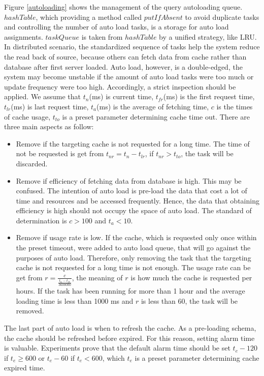 \documentclass{singlecol-new}
\theoremstyle{TH}{
\newtheorem{lemma}{Lemma}
\newtheorem{theorem}[lemma]{Theorem}
\newtheorem{corrolary}[lemma]{Corrolary}
\newtheorem{conjecture}[lemma]{Conjecture}
\newtheorem{proposition}[lemma]{Proposition}
\newtheorem{claim}[lemma]{Claim}
\newtheorem{stheorem}[lemma]{Wrong Theorem}
}
\theoremstyle{THrm}{
\newtheorem{definition}{Definition}[section]
\newtheorem{question}{Question}[section]
\newtheorem{remark}{Remark}
\newtheorem{scheme}{Scheme}
}
\theoremstyle{THhit}{
\newtheorem{case}{Case}[section]
}
\begin{document}
Figure \ref{autoloading} shows the management of the query autoloading queue. $hashTable$, which providing a method called $putIfAbsent$ to avoid duplicate tasks and controlling the number of auto load tasks, is a storage for auto load assignments. $taskQueue$ is taken from $hashTable$ by a unified strategy, like LRU. In distributed scenario, the standardized sequence of tasks help the system reduce the read back of source, because others can fetch data from cache rather than database after first server loaded. Auto load, however, is a double-edged, the system may become unstable if the amount of auto load tasks were too much or update frequency were too high. Accordingly, a strict inspection should be applied. We assume that $t_n$(ms) is current time, $t_{fr}$(ms) is the first request time, $t_{lr}$(ms) is last request time,  $t_a$(ms) is the average of fetching time, $c$ is the times of cache usage, $t_{to}$ is a preset parameter determining cache time out. There are three main aspects as follow:

\begin{itemize}
    \item Remove if the targeting cache is not requested for a long time. The time of not be requested is get from $t_{nr} = t_n - t_{lr}$, if $t_{nr} > t_{to}$, the task will be discarded.
    \item Remove if efficiency of fetching data from database is high. This may be confused. The intention of auto load is pre-load the data that cost a lot of time and resources and be accessed frequently. Hence, the data that obtaining efficiency is high should not occupy the space of auto load. The standard of determination is $c > 100$ and $t_a < 10$.
    \item Remove if usage rate is low. If the cache, which is requested only once within the preset timeout, were added to auto load queue, that will go against the purposes of auto load. Therefore, only removing the task that the targeting cache is not requested for a long time is not enough. The usage rate can be get from $r = \frac{c}{\frac{t_n - t_{fr}}{3600000}}$, the meaning of $r$ is how much the cache is requested per hours. If the task has been running for more than 1 hour and the average loading time is less than 1000 ms and $r$ is less than 60, the task will be removed.
\end{itemize}{}

The last part of auto load is when to refresh the cache. As a pre-loading schema, the cache should be refreshed before expired. For this reason, setting alarm time is valuable. Experiments prove that the default alarm time should be set $t_e - 120$ if $t_e \geq 600$ or $t_e - 60$ if $t_e < 600$, which $t_e$ is a preset parameter determining cache expired time.
\end{document}
